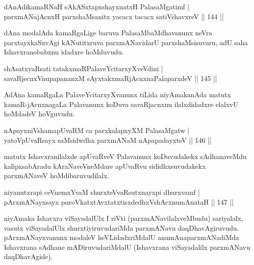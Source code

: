 \begin{shl}
dAnAdikamaRNaH sAkASxtapxshayxnatxH PalasaMgatimf |\\
parxmANajAcnxH parxshaMsanitx yacacx tacacx satiVshavxreV \hfill || 144 ||
\end{shl}

\begin{artha}
dAna modalAda kamaRgaLige baruva PalasaMbaMdhavanunx neVra parxtayxkaSxvAgi kANutitxruva parxmANavidarU parxshaMsisuvaru, adU saha Ishavxranobabxnu idadxre hoMduvudu.
\end{artha}

\begin{shl}
shAsatxyaRsati tatakxmaRPalaveYcitarxyXveVdini |\\
savaRjecnxV\s nupapananxM sAyxtakxmaRjAcnxnaPalaparxdeV \hfill || 145 ||
\end{shl}

\begin{artha}
AdAna kamaRgaLa PalaveYcitarxyXvanunx tiLida niyAmakanAda matutx kamaR-jAcnxnagaLa Palavanunx koDuva savaRjacnxnu ilalxdidadxre elalxvU hoMdadeV hoVguvudu.
\end{artha}


\begin{shl}
nApayxniVshamapUvaRM ca parxkalapxyXM PalasaMgatw |\\
yatoV\s pUvaRsayx saMsidwdhx parxmANaM nApapadayxteV \hfill || 146 ||
\end{shl}

\begin{artha}
matutx Ishavxranilalxde apUvaRveV Palavanunx koDuvudakekx sAdhanaveMdu kalipxsabAradu kAraNaveVneMdare apUvaRvu sididhxsuvudakekx parxmANaveV hoMdibaruvudilalx.
\end{artha}

\begin{shl}
niyanutxrapi ceVnemxYvaM shurxteVvaRsutxnayxpi dhurxvamf |\\
pArxmANayxsayx puroVkatxtAvxtatxtisxdedhxVshAcxnumAnataH \hfill || 147 ||
\end{shl}

\begin{artha}%
niyAmaka Ishavxra viSayadalUlx I riVti (parxmANavilalxveMbudu) sariyalalx, vasutx viSayadalUlx shurxtiyiruvudariMda parxmANavu daqDhavAgiruvudu. pArxmANayxvanunx modaleV heVLidadxriMdalU anumAnaparxmANadiMda Ishavxrana sAdhane mADiruvudariMdalU (Ishavxrana viSayadalilx parxmANavu daqDhavAgide).
\end{artha}

